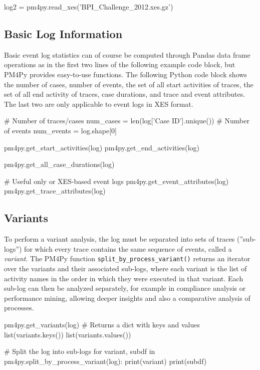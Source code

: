 \begin{pythoncode}
log2 = pm4py.read_xes('BPI_Challenge_2012.xes.gz')
\end{pythoncode}

\subsection*{Basic Log Information}

Basic event log statistics can of course be computed through Pandas data frame operations as in the first two lines of the following example code block, but PM4Py provides easy-to-use functions. The following Python code block shows the number of cases, number of events, the set of all start activities of traces, the set of all end activity of traces, case durations, and trace and event attributes. The last two are only applicable to event logs in XES format.

\begin{pythoncode}
# Number of traces/cases
num_cases = len(log['Case ID'].unique())
# Number of events
num_events = log.shape[0]

pm4py.get_start_activities(log)
pm4py.get_end_activities(log)

pm4py.get_all_case_durations(log)

# Useful only or XES-based event logs
pm4py.get_event_attributes(log)
pm4py.get_trace_attributes(log)
\end{pythoncode}

\subsection*{Variants}

To perform a variant analysis, the log must be separated into sets of traces (''sub-logs'') for which every trace contains the same sequence of events, called a \emph{variant}. The PM4Py function \texttt{split\_by\_process\_variant()} returns an iterator over the variants and their associated sub-logs, where each variant is the list of activity names in the order in which they were executed in that variant. Each sub-log can then be analyzed separately, for example in compliance analysis or performance mining, allowing deeper insights and also a comparative analysis of processes.

\begin{pythoncode}
pm4py.get_variants(log)
# Returns a dict with keys and values
list(variants.keys())
list(variants.values())

# Split the log into sub-logs
for variant, subdf in pm4py.split_by_process_variant(log):
    print(variant)
    print(subdf)  
\end{pythoncode}

